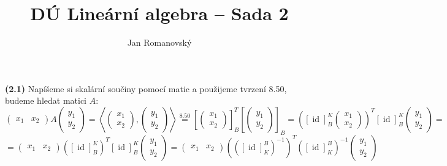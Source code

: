 \documentclass{article}
\title{DÚ Lineární algebra -- Sada 2}
\author{Jan Romanovský}
\begin{document}
\maketitle

\textbf{(2.1)} Napíšeme si skalární součiny pomocí matic a použijeme tvrzení 8.50, budeme hledat matici $A$:
$$\begin{pmatrix}
  x_1 & x_2
\end{pmatrix}A\begin{pmatrix}
  y_1 \\ y_2
\end{pmatrix}= \left\langle\begin{pmatrix}
  x_1 \\ x_2
\end{pmatrix}, \begin{pmatrix}
  y_1 \\ y_2
\end{pmatrix} \right\rangle \stackrel{8.50}{=}\left[\begin{pmatrix}
  x_1 \\ x_2
\end{pmatrix}\right]_B^T\left[\begin{pmatrix}
  y_1 \\ y_2
\end{pmatrix}\right]_B=\left([\operatorname{id}]_B^K\begin{pmatrix}
  x_1 \\ x_2
\end{pmatrix}\right)^T[\operatorname{id}]_B^K\begin{pmatrix}
  y_1 \\ y_2
\end{pmatrix}=$$ $$ = \begin{pmatrix}
  x_1 & x_2
\end{pmatrix} \left([\operatorname{id}]_B^K\right)^T[\operatorname{id}]_B^K\begin{pmatrix}
  y_1 \\ y_2
\end{pmatrix} = \begin{pmatrix}
  x_1 & x_2
\end{pmatrix} \left(\left([\operatorname{id}]_K^B\right)^{-1}\right)^T\left([\operatorname{id}]_K^B\right)^{-1}\begin{pmatrix}
  y_1 \\ y_2
\end{pmatrix}$$
\end{document}
